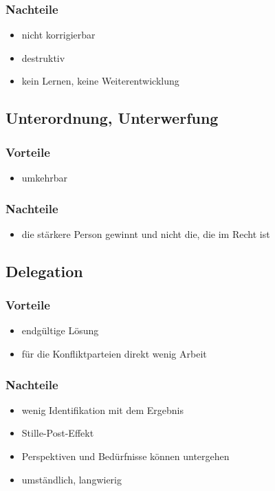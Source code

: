 \subsubsection{Nachteile}
\begin{itemize}
  \item nicht korrigierbar
  \item destruktiv
  \item kein Lernen, keine Weiterentwicklung
\end{itemize}


\subsection{Unterordnung, Unterwerfung}

\subsubsection{Vorteile}
\begin{itemize}
  \item umkehrbar
\end{itemize}

\subsubsection{Nachteile}
\begin{itemize}
  \item die stärkere Person gewinnt und nicht die, die im Recht ist
\end{itemize}


\subsection{Delegation}

\subsubsection{Vorteile}
\begin{itemize}
  \item endgültige Lösung
  \item für die Konfliktparteien direkt wenig Arbeit
\end{itemize}

\subsubsection{Nachteile}
\begin{itemize}
  \item wenig Identifikation mit dem Ergebnis
  \item Stille-Post-Effekt
  \item Perspektiven und Bedürfnisse können untergehen
  \item umständlich, langwierig
\end{itemize}


